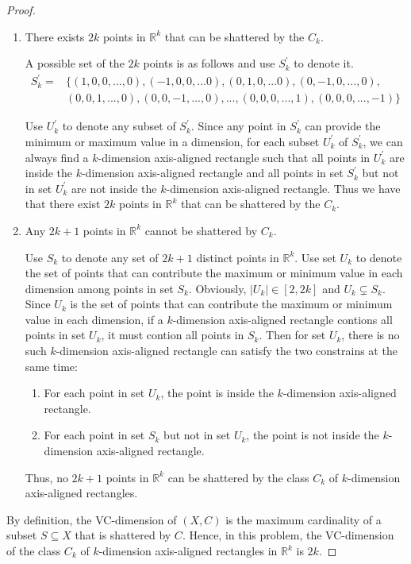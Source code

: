 \begin{proof}
    \noindent
    \begin{enumerate}
        \item  There exists $2k$ points in $\mathbb{R}^k$ that can be shattered by the $C_k$.
        
    A possible set of the $2k$ points is as follows and use $S^\prime_k$ to denote it.
    \begin{align}
        \nonumber S^\prime_k=&\{(1,0,0,...,0),(-1,0,0,...0),(0,1,0,...0),(0,-1,0,...,0),\\
        \nonumber &(0,0,1,...,0),(0,0,-1,...,0),...,(0,0,0,...,1),(0,0,0,...,-1)\}
    \end{align}

    Use $U^\prime_k$ to denote any subset of $S^\prime_k$.
    Since any point in $S^\prime_k$ can provide the minimum or maximum value in a dimension,
    for  each subset $U^\prime_k$ of $S^\prime_k$, we can always find a $k$-dimension axis-aligned rectangle such that 
    all points in $U^\prime_k$ are inside the $k$-dimension axis-aligned rectangle and 
    all points in set $S^\prime_k$ but not in set $U^\prime_k$ are not inside the $k$-dimension axis-aligned rectangle.
    Thus we have that there exist $2k$ points in $\mathbb{R}^k$ that can be shattered by the $C_k$.
    \item Any $2k+1$ points in $\mathbb{R}^k$ cannot be shattered by $C_k$.

    Use $S_k$ to denote any set of $2k+1$ distinct points in $\mathbb{R}^k$.
    Use set $U_k$ to denote the set of points that can contribute the maximum or minimum value in each dimension among points in set $S_k$.
    Obviously, $|U_k|\in[2,2k]$ and $U_k\subsetneq S_k$.
    Since $U_k$ is the set of points that can contribute the maximum or minimum value in each dimension,
    if a $k$-dimension axis-aligned rectangle contions all points in set $U_k$, it must contion all points in $S_k$.
    Then for set $U_k$, there is no such $k$-dimension axis-aligned rectangle can satisfy the two constrains at the same time:
    \begin{enumerate}
        \item For each point in set $U_k$, the point is inside the $k$-dimension axis-aligned rectangle.
        \item  For each point in set $S_k$ but not in set $U_k$, the point is not inside the $k$-dimension axis-aligned rectangle.
    \end{enumerate}

    Thus, no $2k+1$ points in $\mathbb{R}^k$ can be shattered by the class $C_k$ of $k$-dimension axis-aligned rectangles.
\end{enumerate}
   
By definition, the VC-dimension of $(X, C)$ is the maximum cardinality of a subset $S \subseteq X$ that is shattered by $C$.
Hence, in this problem, the VC-dimension of the class $C_k$ of $k$-dimension axis-aligned rectangles in $\mathbb{R}^k$ is $2k$.
\end{proof}
